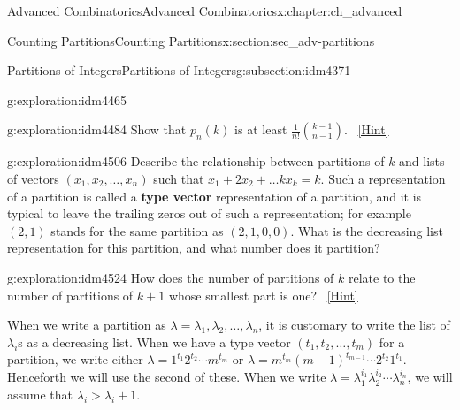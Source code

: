 \documentclass[oneside,10pt,]{book}
\newcommand{\terminology}[1]{\textbf{#1}}
\numberwithin{equation}{chapter}
\begin{document}
\begin{chapterptx}{Advanced Combinatorics}{}{Advanced Combinatorics}{}{}{x:chapter:ch_advanced}
\begin{sectionptx}{Counting Partitions}{}{Counting Partitions}{}{}{x:section:sec_adv-partitions}
\begin{subsectionptx}{Partitions of Integers}{}{Partitions of Integers}{}{}{g:subsection:idm4371}
\begin{exploration}{}{g:exploration:idm4465}
\end{exploration}
\begin{exploration}{}{g:exploration:idm4484}%
Show that \(p_n(k)\) is at least \(\frac{1}{n!}\binom{k-1}{n-1}\).%
\qquad~\hfill{\tiny\hyperlink{g:hint:idm4489-back}{[Hint]}}\end{exploration}
\begin{exploration}{}{g:exploration:idm4506}%
Describe the relationship between partitions of \(k\) and lists of vectors \((x_1,x_2,\ldots,x_n)\) such that \(x_1+2x_2+\ldots kx_k = k\).  Such a representation of a partition is called a \terminology{type vector} representation of a partition, and it is typical to leave the trailing zeros out of such a representation; for example \((2,1)\) stands for the same partition as \((2,1,0,0)\). What is the decreasing list representation for this partition, and what number does it partition?%
\end{exploration}
\begin{exploration}{}{g:exploration:idm4524}%
How does the number of partitions of \(k\) relate to the number of partitions of \(k+1\) whose smallest part is one?%
\qquad~\hfill{\tiny\hyperlink{g:hint:idm4529-back}{[Hint]}}\end{exploration}
When we write a partition as \(\lambda = \lambda_1,\lambda_2,\ldots,\lambda_n\), it is customary to write the list of \(\lambda_i\)s as a decreasing list. When we have a type vector \((t_1,t_2,\ldots,t_m)\) for a partition, we write either \(\lambda = 1^{t_1}2^{t_2}\cdots m^{t_m}\) or \(\lambda = m^{t_m}(m-1)^{t_{m-1}}\cdots 2^{t_2}1^{t_1}\). Henceforth we will use the second of these. When we write \(\lambda=\lambda_1^{i_1}\lambda_2^{i_2}\cdots\lambda_n^{i_n}\), we will assume that \(\lambda_i>\lambda_i+1\).%
\par

\end{subsectionptx}
\end{sectionptx}
\end{chapterptx}
\end{document}
